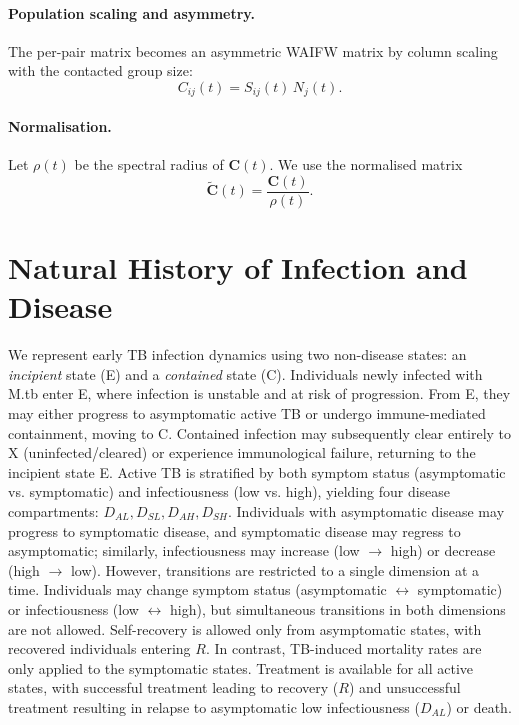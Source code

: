 \documentclass[11pt]{article}
\begin{document}
\paragraph{Population scaling and asymmetry.}
The per-pair matrix becomes an asymmetric WAIFW matrix by column scaling with the contacted group size:
\[
C_{ij}(t) = S_{ij}(t)\, N_j(t).
\]

\paragraph{Normalisation.}
Let \(\rho(t)\) be the spectral radius of \(\mathbf{C}(t)\). We use the normalised matrix
\[
\tilde{\mathbf{C}}(t) = \frac{\mathbf{C}(t)}{\rho(t)}.
\]

\section{Natural History of Infection and Disease}
We represent early TB infection dynamics using two non-disease states: an \emph{incipient} state (E) and a \emph{contained} state (C). Individuals newly infected with M.tb enter E, where infection is unstable and at risk of progression. From E, they may either progress to asymptomatic active TB or undergo immune-mediated containment, moving to C. Contained infection may subsequently clear entirely to X (uninfected/cleared) or experience immunological failure, returning to the incipient state E.
Active TB is stratified by both symptom status (asymptomatic vs. symptomatic) and infectiousness (low vs. high), yielding four disease compartments: $D_{AL}, D_{SL}, D_{AH}, D_{SH}$. Individuals with asymptomatic disease may progress to symptomatic disease, and symptomatic disease may regress to asymptomatic; similarly, infectiousness may increase (low $\to$ high) or decrease (high $\to$ low).
However, transitions are restricted to a single dimension at a time. Individuals may change symptom status (asymptomatic $\leftrightarrow$ symptomatic) or infectiousness (low $\leftrightarrow$ high), but simultaneous transitions in both dimensions are not allowed. 
Self-recovery is allowed only from asymptomatic states, with recovered individuals entering $R$. In contrast, TB-induced mortality rates are only applied to the symptomatic states.
Treatment is available for all active states, with successful treatment leading to recovery ($R$) and unsuccessful treatment resulting in relapse to asymptomatic low infectiousness ($D_{AL}$) or death.
\end{document}
